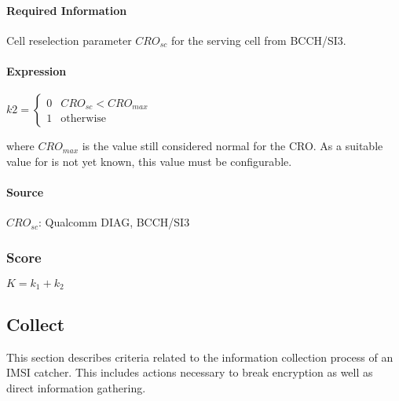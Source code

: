 \documentclass[a4paper,11pt,notitlepage,bigheadings,oneside]{scrartcl}
\begin{document}
\paragraph{Required Information}

Cell reselection parameter $CRO_{sc}$ for the serving cell from BCCH/SI3.

\paragraph{Expression}

$k2 =
\begin{cases}
	0 & CRO_{sc} < CRO_{max}\\
	1 & \text{otherwise}
\end{cases}$

where $CRO_{max}$ is the value still considered normal for the CRO. As a
suitable value for is not yet known, this value must be configurable.

\paragraph{Source}

$CRO_{sc}$: Qualcomm DIAG, BCCH/SI3




\subsubsection{Score}

$K = k_1 + k_2$

\subsection{Collect}

This section describes criteria related to the information collection process
of an IMSI catcher. This includes actions necessary to break encryption as well
as direct information gathering.

\subsubsection{}
\end{document}
